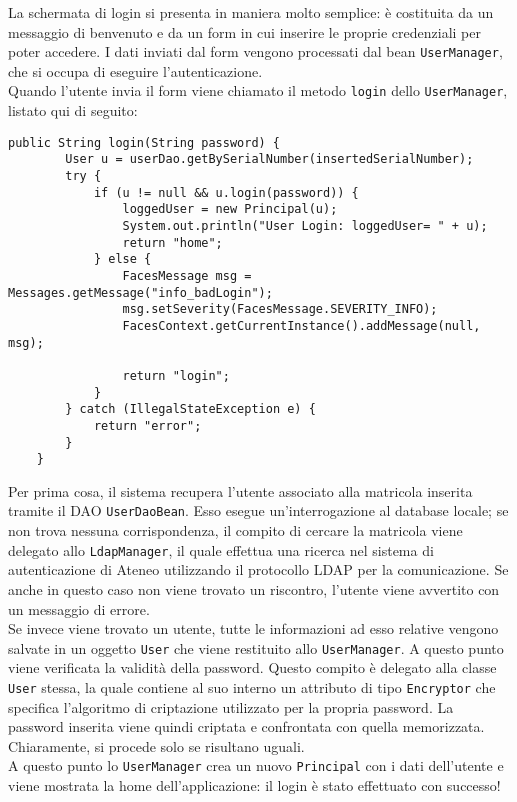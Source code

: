 

La schermata di login si presenta in maniera molto semplice: è costituita da un messaggio di benvenuto e da un form in cui inserire le proprie credenziali per poter accedere. I dati inviati dal form vengono processati dal bean \lstinline{UserManager}, che si occupa di eseguire l'autenticazione.\\
Quando l'utente invia il form viene chiamato il metodo \lstinline{login} dello \lstinline{UserManager}, listato qui di seguito:

\begin{lstlisting}
public String login(String password) {
		User u = userDao.getBySerialNumber(insertedSerialNumber);
		try {
			if (u != null && u.login(password)) {
				loggedUser = new Principal(u);
				System.out.println("User Login: loggedUser= " + u);
				return "home";
			} else {
				FacesMessage msg = Messages.getMessage("info_badLogin");
				msg.setSeverity(FacesMessage.SEVERITY_INFO);
				FacesContext.getCurrentInstance().addMessage(null, msg);
				
				return "login";
			}
		} catch (IllegalStateException e) {
			return "error";
		}
	}
\end{lstlisting}

Per prima cosa, il sistema recupera l'utente associato alla matricola inserita tramite il DAO \lstinline{UserDaoBean}. Esso esegue un'interrogazione al database locale; se non trova nessuna corrispondenza, il compito di cercare la matricola viene delegato  allo \lstinline{LdapManager}, il quale effettua una ricerca nel sistema di autenticazione di Ateneo utilizzando il protocollo LDAP per la comunicazione. Se anche in questo caso non viene trovato un riscontro, l'utente viene avvertito con un messaggio di errore.\\
Se invece viene trovato un utente, tutte le informazioni ad esso relative vengono salvate in un oggetto \lstinline{User} che viene restituito allo \lstinline{UserManager}. A questo punto viene verificata la validità della password. Questo compito è delegato alla classe \lstinline{User} stessa, la quale contiene al suo interno un attributo di tipo \lstinline{Encryptor} che specifica l'algoritmo di criptazione utilizzato per la propria password. La password inserita viene quindi criptata e confrontata con quella memorizzata. Chiaramente, si procede solo se risultano uguali.\\
A questo punto lo \lstinline{UserManager} crea un nuovo \lstinline{Principal} con i dati dell'utente e viene mostrata la home dell'applicazione: il login è stato effettuato con successo!